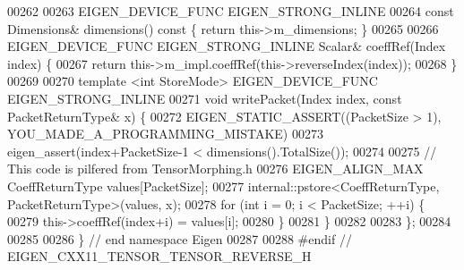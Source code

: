 \begin{DoxyCode}
00262 
00263   EIGEN\_DEVICE\_FUNC EIGEN\_STRONG\_INLINE
00264   \textcolor{keyword}{const} Dimensions& dimensions()\textcolor{keyword}{ const }\{ \textcolor{keywordflow}{return} this->m\_dimensions; \}
00265 
00266   EIGEN\_DEVICE\_FUNC EIGEN\_STRONG\_INLINE Scalar& coeffRef(Index index) \{
00267     \textcolor{keywordflow}{return} this->m\_impl.coeffRef(this->reverseIndex(index));
00268   \}
00269 
00270   \textcolor{keyword}{template} <\textcolor{keywordtype}{int} StoreMode> EIGEN\_DEVICE\_FUNC EIGEN\_STRONG\_INLINE
00271   \textcolor{keywordtype}{void} writePacket(Index index, \textcolor{keyword}{const} PacketReturnType& x) \{
00272     EIGEN\_STATIC\_ASSERT((PacketSize > 1), YOU\_MADE\_A\_PROGRAMMING\_MISTAKE)
00273     eigen\_assert(index+PacketSize-1 < dimensions().TotalSize());
00274 
00275     \textcolor{comment}{// This code is pilfered from TensorMorphing.h}
00276     EIGEN\_ALIGN\_MAX CoeffReturnType values[PacketSize];
00277     internal::pstore<CoeffReturnType, PacketReturnType>(values, x);
00278     \textcolor{keywordflow}{for} (\textcolor{keywordtype}{int} i = 0; i < PacketSize; ++i) \{
00279       this->coeffRef(index+i) = values[i];
00280     \}
00281   \}
00282 
00283 \};
00284 
00285 
00286 \}  \textcolor{comment}{// end namespace Eigen}
00287 
00288 \textcolor{preprocessor}{#endif // EIGEN\_CXX11\_TENSOR\_TENSOR\_REVERSE\_H}
\end{DoxyCode}

